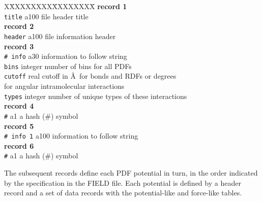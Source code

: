 \begin{tabbing}
X\=XXXXXXXX\=XXXXXXXX\=\kill
{\bf record 1} \\
\> {\tt title}     \> a100    \> file header title \\
{\bf record 2} \\
\> {\tt header}    \> a100    \> file information header \\
{\bf record 3} \\
\> {\tt \# info}   \> a30     \> information to follow string \\
\> {\tt bins}   \> integer \> number of bins for all PDFs \\
\> {\tt cutoff} \> real    \> cutoff in \AA~for bonds and RDFs or degrees \\
\>                 \>         \> for angular intramolecular interactions \\
\> {\tt types}  \> integer \> number of unique types of these interactions \\
{\bf record 4} \\
\> {\tt \#}        \> a1      \> a hash (\#) symbol \\
{\bf record 5} \\
\> {\tt \# info 1} \> a100    \> information to follow string \\
{\bf record 6} \\
\> {\tt \#}        \> a1      \> a hash (\#) symbol
\end{tabbing}

The subsequent records define each PDF potential in turn,
in the order indicated by the specification in the FIELD file.
Each potential is defined by a header record and a set of data
records with the potential-like and force-like tables.

